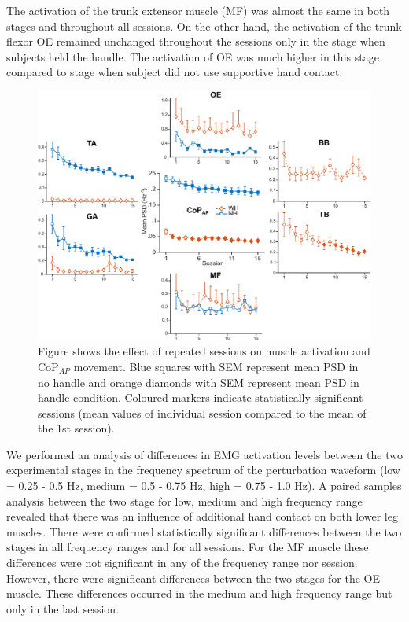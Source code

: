 The activation of the trunk extensor muscle (MF) was almost the same in both stages and throughout all sessions. On the other hand, the activation of the trunk flexor OE remained unchanged throughout the sessions only in the stage when subjects held the handle. The activation of OE was much higher in this stage compared to stage when subject did not use supportive hand contact.

\begin{figure}[!t]
	\begin{center}
		\includegraphics[width=\linewidth]{images/meanErrorBarsAll.pdf}
		\caption{Figure shows the effect of repeated sessions on muscle activation and CoP$_{AP}$ movement. Blue squares with SEM represent mean PSD in no handle and orange diamonds with SEM represent mean PSD in handle condition. Coloured markers indicate statistically significant sessions (mean values of individual session compared to the mean of the 1st session).}
		\label{fig:meanErrorBars}
	\end{center}
\end{figure}

We performed an analysis of differences in EMG activation levels between the two experimental stages in the frequency spectrum of the perturbation waveform (low = 0.25 - 0.5 Hz, medium = 0.5 - 0.75 Hz, high = 0.75 - 1.0 Hz). A paired samples analysis between the two stage for low, medium and high frequency range revealed that there was an influence of additional hand contact on both lower leg muscles. There were confirmed statistically significant differences between the two stages in all frequency ranges and for all sessions. For the MF muscle these differences were not significant in any of the frequency range nor session. However, there were significant differences between the two stages for the OE muscle. These differences occurred in the medium and high frequency range but only in the last session.

